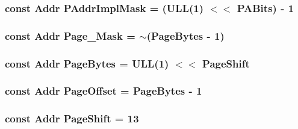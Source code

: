 \label{namespaceMipsISA_a730eba39b1e25cb11460a3f90f49aa15}
\hypertarget{namespaceMipsISA_abb8b7685b079953e35015543262458e2}{
\subsubsection[{PAddrImplMask}]{\setlength{\rightskip}{0pt plus 5cm}const {\bf Addr} {\bf PAddrImplMask} = (ULL(1) $<$$<$ {\bf PABits}) -\/ 1}}
\label{namespaceMipsISA_abb8b7685b079953e35015543262458e2}
\hypertarget{namespaceMipsISA_ac2d47d845cf48dbc176f717bb7d50a7f}{
\subsubsection[{Page\_\-Mask}]{\setlength{\rightskip}{0pt plus 5cm}const {\bf Addr} {\bf Page\_\-Mask} = $\sim$({\bf PageBytes} -\/ 1)}}
\label{namespaceMipsISA_ac2d47d845cf48dbc176f717bb7d50a7f}
\hypertarget{namespaceMipsISA_ad9d6a4d965e107c9a7214f096107296b}{
\subsubsection[{PageBytes}]{\setlength{\rightskip}{0pt plus 5cm}const {\bf Addr} {\bf PageBytes} = ULL(1) $<$$<$ {\bf PageShift}}}
\label{namespaceMipsISA_ad9d6a4d965e107c9a7214f096107296b}
\hypertarget{namespaceMipsISA_a51e1064f1269394dc26702651be5061f}{
\subsubsection[{PageOffset}]{\setlength{\rightskip}{0pt plus 5cm}const {\bf Addr} {\bf PageOffset} = {\bf PageBytes} -\/ 1}}
\label{namespaceMipsISA_a51e1064f1269394dc26702651be5061f}
\hypertarget{namespaceMipsISA_a6eacddc1d6d191380d9afdac5920ea48}{
\subsubsection[{PageShift}]{\setlength{\rightskip}{0pt plus 5cm}const {\bf Addr} {\bf PageShift} = 13}}
\label{namespaceMipsISA_a6eacddc1d6d191380d9afdac5920ea48}
